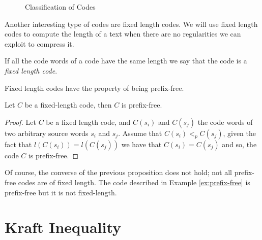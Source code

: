 \begin{figure}[t]
\centering
{}
\caption{\label{fig:Classification-Codes}Classification of Codes}
\end{figure}

Another interesting type of codes are fixed length codes. We will use fixed length codes to compute the length of a text when there are no regularities we can exploit to compress it.

\begin{definition}
\label{def:Fixed-Length-Codes}
If all the code words of a code have the same length we say that the code is a \emph{fixed length code}.
\end{definition}

Fixed length codes have the property of being prefix-free.

\begin{proposition}
Let $C$ be a fixed-length code, then $C$ is prefix-free.
\end{proposition}
\begin{proof}
Let $C$ be a fixed length code, and $C(s_i)$ and $C(s_j)$ the code words of two arbitrary source words $s_i$ and $s_j$. Assume that $C(s_i) <_p C(s_j)$, given the fact that $l(C(s_i)) = l(C(s_j))$ we have that $C(s_i) = C(s_j)$ and so, the code $C$ is prefix-free.
\end{proof}

Of course, the converse of the previous proposition does not hold; not all prefix-free codes are of fixed length. The code described in Example \ref{ex:prefix-free} is prefix-free but it is not fixed-length.

%
%

\section{Kraft Inequality}

